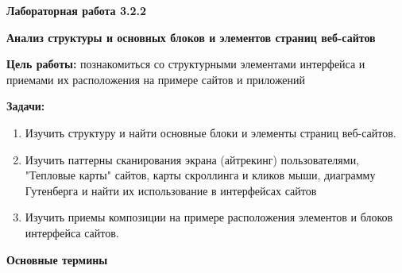 
\graphicspath{ {3.2.2/models/} }

\pagestyle{fancy}
\fancyhead{}
\renewcommand{\headrulewidth}{0pt}


\begin{center}
    \textbf{Лабораторная работа 3.2.2}

    \textbf{Анализ структуры и основных блоков и элементов страниц веб-сайтов}
\end{center}

\textbf{Цель работы:} познакомиться со структурными элементами интерфейса и приемами их расположения на примере сайтов и приложений
\bigskip

\textbf{Задачи:}

\begin{enumerate}
    \item Изучить структуру и найти основные блоки и элементы страниц веб-сайтов.
    \item Изучить паттерны сканирования экрана (айтрекинг) пользователями, "Тепловые карты" сайтов, карты скроллинга и кликов мыши, диаграмму Гутенберга и найти их использование в интерфейсах  сайтов 
    \item Изучить приемы композиции на примере расположения элементов и блоков интерфейса сайтов.

\end{enumerate}
\bigskip

\textbf{Основные термины}

